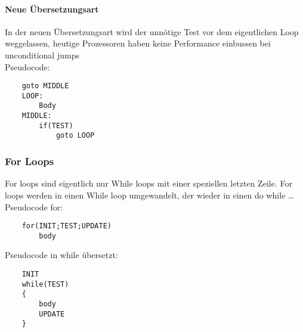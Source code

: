 \documentclass[a4paper, 11pt]{article}
\begin{document}
\paragraph{Neue Übersetzungsart}
In der neuen Übersetzungsart wird der unnötige Test vor dem eigentlichen Loop weggelassen, heutige Prozessoren haben keine Performance einbussen bei unconditional jumps\\
Pseudocode:
\begin{lstlisting}
	goto MIDDLE
	LOOP:
		Body
	MIDDLE:
		if(TEST)
			goto LOOP
\end{lstlisting}

\subsubsection{For Loops}
For loops sind eigentlich nur While loops mit einer speziellen letzten Zeile. For loops werden in einen While loop umgewandelt, der wieder in einen do while \dots\\
Pseudocode for:
\begin{lstlisting}
	for(INIT;TEST;UPDATE)
		body
\end{lstlisting}
Pseudocode in while übersetzt:
\begin{lstlisting}
	INIT
	while(TEST)
	{
		body
		UPDATE
	}
\end{lstlisting}
\end{document}
